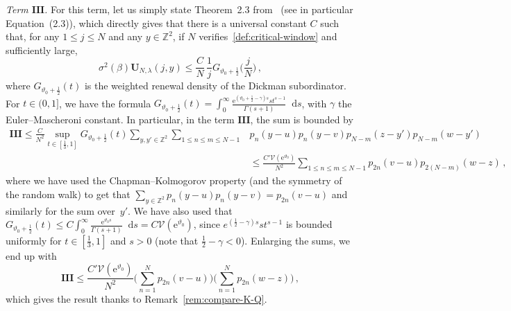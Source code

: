 \documentclass[11pt]{amsart}
\numberwithin{equation}{section}
\newcommand*{\numberset}{\mathbb}
\newcommand*{\Z}{\numberset{Z}}
\newcommand{\e}{\mathrm{e}}
\newcommand*\dd{\mathop{}\!\mathrm{d}}
\theoremstyle{plain}
\theoremstyle{definition}
\theoremstyle{remark}
\begin{document}
\smallskip
\textit{Term \(\mathbf{III}\). }
For this term, let us simply state Theorem~2.3 from~\cite{CSZ19b} (see in particular Equation~(2.3)), which directly gives that there is a universal constant \(C\) such that, for any \(1\leq j \leq N\) and any \(y\in \Z^2\), if \(N\) verifies~\eqref{def:critical-window} and sufficiently large,
\[
\sigma^2(\beta) \mathbf{U}_{N,\lambda} (j,y) \leq \frac{C}{N} \, \frac{1}{j} G_{\vartheta_0+\frac12}\Big(\frac{j}{N}\Big) \,,
\]
where \(G_{\vartheta_0+\frac12}(t)\) is the weighted renewal density of the Dickman subordinator.
For \(t\in (0,1]\), we have the formula \(G_{\vartheta_0+\frac12}(t) = \int_0^{\infty} \frac{\e^{(\vartheta_0+\frac12-\gamma)s} s t^{s-1}}{\Gamma(s+1)} \dd s\), with \(\gamma\) the Euler--Mascheroni constant.
In particular, in the term \(\mathbf{III}\), the sum is bounded by 
\[
\begin{split}
\mathbf{III} \leq \frac{C}{N^2} \sup_{t \in [\frac13,1]} G_{\vartheta_0+\frac12}(t) \sum_{y,y'\in \Z^2}  \sum_{1\leq n\leq m\leq N-1} & p_n(y-u)p_n(y-v) p_{N-m}(z-y') p_{N-m}(w-y')\\
& \leq \frac{C' \mathcal{V}(\e^{\vartheta_0})}{N^2}  \sum_{1\leq n \leq m \leq N-1} p_{2n}(v-u) p_{2(N-m)}(w-z) \,,
\end{split}
\]
where we have used the Chapman--Kolmogorov property (and the symmetry of the random walk) to get that \(\sum_{y\in \Z^2} p_n(y-u)p_n(y-v)  = p_{2n}(v-u)\) and similarly for the sum over~\(y'\).
We have also used that \(G_{\vartheta_0+\frac12}(t) \leq C\int_0^{\infty} \frac{\e^{\vartheta_0 s}}{\Gamma(s+1)}\dd s = C\mathcal{V}(\e^{\vartheta_0})\), since \(e^{(\frac12-\gamma) s}s t^{s-1}\) is bounded uniformly for \( t \in [\frac13,1]\) and \(s>0\) (note that \(\frac12-\gamma<0\)).
Enlarging the sums, we end up with\
\[
\mathbf{III} \leq \frac{C' \mathcal{V}(\e^{\vartheta_0})}{N^2}  \Big( \sum_{n=1}^{N} p_{2n}(v-u) \Big) \Big( \sum_{n=1}^{N} p_{2n}(w-z) \Big) \,,
\]
which gives the result thanks to Remark~\ref{rem:compare-K-Q}.
\end{document}
